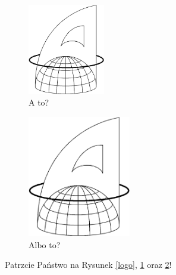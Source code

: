 \documentclass[12pt,a4paper]{article}
\begin{document}
\begin{figure}[h]
\begin{flushleft}
\includegraphics[width=0.3\textwidth]{logo.png}
\end{flushleft}
\caption{\label{almu} A to?}
\end{figure}

\begin{figure}[p]
\begin{flushright}
\includegraphics[width=0.4\textwidth]{logo.png}
\end{flushright}
\caption{\label{kantaratu}Albo to?}
\end{figure}

Patrzcie Państwo na Rysunek \ref{logo}, \ref{almu} oraz \ref{kantaratu}!
\end{document}
